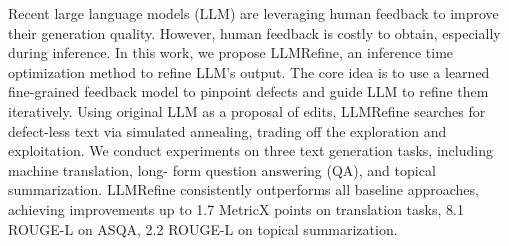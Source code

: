 Recent large language models (LLM) are leveraging human feedback to improve their generation quality. However, human feedback is costly to obtain, especially during inference. In this work, we propose LLMRefine, an inference time optimization method to refine LLM’s output. The core idea is to use a learned fine-grained feedback model to pinpoint defects and guide LLM to refine them iteratively. Using original LLM as a proposal of edits, LLMRefine searches for defect-less text via simulated annealing, trading off the exploration and exploitation. We conduct experiments on three text generation tasks, including machine translation, long- form question answering (QA), and topical summarization. LLMRefine consistently outperforms all baseline approaches, achieving improvements up to 1.7 MetricX points on translation tasks, 8.1 ROUGE-L on ASQA, 2.2 ROUGE-L on topical summarization.